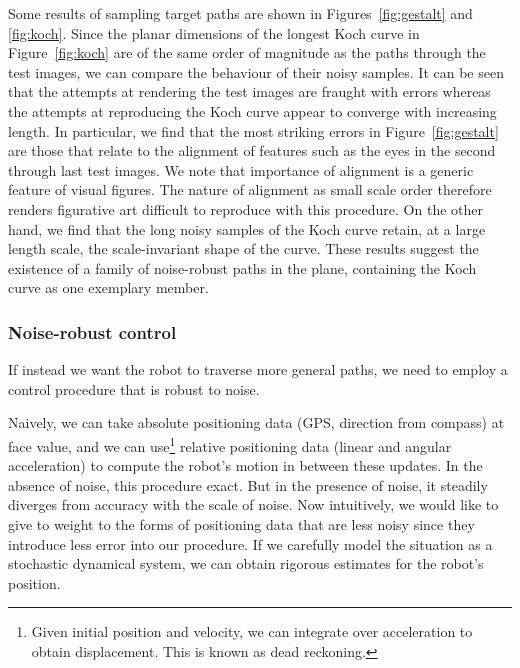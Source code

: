         Some results of sampling target paths are shown in Figures~\ref{fig:gestalt} and \ref{fig:koch}.
        Since the planar dimensions of the longest Koch curve in Figure~\ref{fig:koch} are of the same order of magnitude as the paths through the test images, we can compare the behaviour of their noisy samples.
        It can be seen that the attempts at rendering the test images are fraught with errors whereas the attempts at reproducing the Koch curve appear to converge with increasing length.
        In particular, we find that the most striking errors in Figure~\ref{fig:gestalt} are those that relate to the alignment of features such as the eyes in the second through last test images.
        We note that importance of alignment is a generic feature of visual figures.
        The nature of alignment as small scale order therefore renders figurative art difficult to reproduce with this procedure.
        On the other hand, we find that the long noisy samples of the Koch curve retain, at a large length scale, the scale-invariant shape of the curve.
        These results suggest the existence of a family of noise-robust paths in the plane, containing the Koch curve as one exemplary member.



        \subsubsection{Noise-robust control}
        If instead we want the robot to traverse more general paths, we need to employ a control procedure that is robust to noise.

        Naively, we can take absolute positioning data (GPS, direction from compass) at face value, and we can use\footnote{Given initial position and velocity, we can integrate over acceleration to obtain displacement. This is known as dead reckoning.} relative positioning data (linear and angular acceleration) to compute the robot's motion in between these updates.
        In the absence of noise, this procedure exact.
        But in the presence of noise, it steadily diverges from accuracy with the scale of noise.
        Now intuitively, we would like to give to weight to the forms of positioning data that are less noisy since they introduce less error into our procedure.
        If we carefully model the situation as a stochastic dynamical system, we can obtain rigorous estimates for the robot's position.

